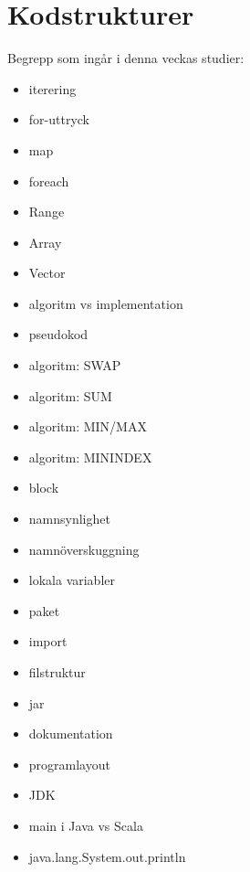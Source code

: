 \chapter{Kodstrukturer}\label{chapter:W02}
Begrepp som ingår i denna veckas studier:
\begin{itemize}[noitemsep,label={$\square$},leftmargin=*]
\item iterering
\item for-uttryck
\item map
\item foreach
\item Range
\item Array
\item Vector
\item algoritm vs implementation
\item pseudokod
\item algoritm: SWAP
\item algoritm: SUM
\item algoritm: MIN/MAX
\item algoritm: MININDEX
\item block
\item namnsynlighet
\item namnöverskuggning
\item lokala variabler
\item paket
\item import
\item filstruktur
\item jar
\item dokumentation
\item programlayout
\item JDK
\item main i Java vs Scala
\item java.lang.System.out.println\end{itemize}
